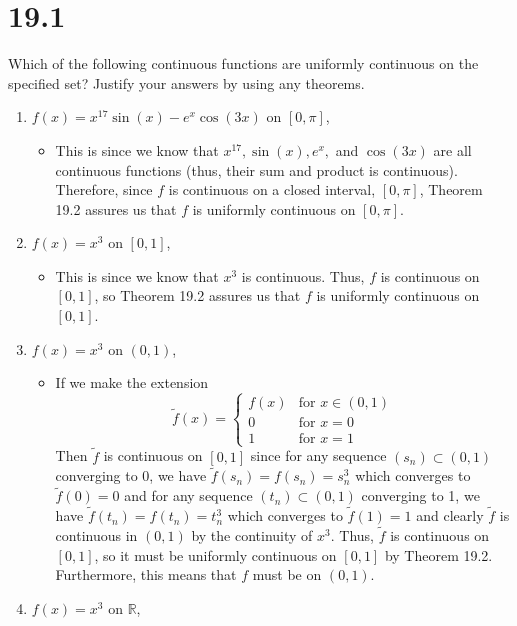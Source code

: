 \documentclass[10pt,a4paper]{article}
\theoremstyle{definition}
\begin{document}
\section*{19.1}
Which of the following continuous functions are uniformly continuous on the specified set? Justify your answers by using any theorems.
\begin{enumerate}[label = (\alph*)]
\item $f(x) = x^{17}\sin(x) - e^x\cos(3x)$ on $[0, \pi]$,
	\begin{itemize}
	\item This is  since we know that $x^{17}, \sin(x), e^x,$ and $\cos(3x)$ are all continuous functions (thus, their sum and product is continuous). Therefore, since $f$ is continuous on a closed interval, $[0, \pi]$, Theorem 19.2 assures us that $f$ is uniformly continuous on $[0,\pi]$.
	\end{itemize}
\item $f(x) = x^3$ on $[0,1]$,
	\begin{itemize}
	\item This is  since we know that $x^3$ is continuous. Thus, $f$ is continuous on $[0,1]$, so Theorem 19.2 assures us that $f$ is uniformly continuous on $[0,1]$.
	\end{itemize}
\item $f(x) = x^3$ on $(0,1)$,
\begin{itemize}
	\item If we make the extension
	\[\tilde{f}(x) = \begin{cases}
	f(x) &\text{for } x\in (0,1)\\
	0 &\text{for } x = 0\\
	1 &\text{for } x = 1
	\end{cases}\]
	Then $\tilde{f}$ is continuous on $[0,1]$ since for any sequence $(s_n) \subset (0,1)$ converging to 0, we have $\tilde{f}(s_n) = f(s_n) = s_n^3$ which converges to $\tilde{f}(0) = 0$ and for any sequence $(t_n) \subset (0,1)$ converging to 1, we have $\tilde{f}(t_n) = f(t_n) = t_n^3$ which converges to $\tilde{f}(1) = 1$ and clearly $\tilde{f}$ is continuous in $(0,1)$ by the continuity of $x^3$. Thus, $\tilde{f}$ is continuous on $[0,1]$, so it must be uniformly continuous on $[0,1]$ by Theorem 19.2. Furthermore, this means that $f$ must be  on $(0,1)$.
	\end{itemize}
\item $f(x) = x^3$ on $\mathbb{R}$,
	\begin{itemize}

\end{itemize}
\end{enumerate}
\end{document}
